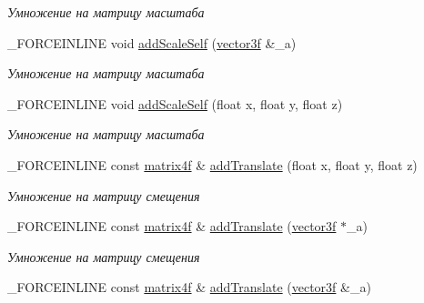 \begin{DoxyCompactItemize}
\begin{DoxyCompactList}\small\item\em Умножение на матрицу масштаба \end{DoxyCompactList}\item 
\hypertarget{classbt_1_1matrix4f_af8ae66d728afba44bf628a50da952781}{\-\_\-\-F\-O\-R\-C\-E\-I\-N\-L\-I\-N\-E void \hyperlink{classbt_1_1matrix4f_af8ae66d728afba44bf628a50da952781}{add\-Scale\-Self} (\hyperlink{classbt_1_1vector3f}{vector3f} \&\-\_\-a)}\label{classbt_1_1matrix4f_af8ae66d728afba44bf628a50da952781}

\begin{DoxyCompactList}\small\item\em Умножение на матрицу масштаба \end{DoxyCompactList}\item 
\hypertarget{classbt_1_1matrix4f_a6e9fc1f72c550c2051bb62585d600c09}{\-\_\-\-F\-O\-R\-C\-E\-I\-N\-L\-I\-N\-E void \hyperlink{classbt_1_1matrix4f_a6e9fc1f72c550c2051bb62585d600c09}{add\-Scale\-Self} (float x, float y, float z)}\label{classbt_1_1matrix4f_a6e9fc1f72c550c2051bb62585d600c09}

\begin{DoxyCompactList}\small\item\em Умножение на матрицу масштаба \end{DoxyCompactList}\item 
\hypertarget{classbt_1_1matrix4f_a793acb1ecdce969f670ce13fd0b6f68d}{\-\_\-\-F\-O\-R\-C\-E\-I\-N\-L\-I\-N\-E const \hyperlink{classbt_1_1matrix4f}{matrix4f} \& \hyperlink{classbt_1_1matrix4f_a793acb1ecdce969f670ce13fd0b6f68d}{add\-Translate} (float x, float y, float z)}\label{classbt_1_1matrix4f_a793acb1ecdce969f670ce13fd0b6f68d}

\begin{DoxyCompactList}\small\item\em Умножение на матрицу смещения \end{DoxyCompactList}\item 
\hypertarget{classbt_1_1matrix4f_aef54d68c64156a99a8e151da9c5f2cc1}{\-\_\-\-F\-O\-R\-C\-E\-I\-N\-L\-I\-N\-E const \hyperlink{classbt_1_1matrix4f}{matrix4f} \& \hyperlink{classbt_1_1matrix4f_aef54d68c64156a99a8e151da9c5f2cc1}{add\-Translate} (\hyperlink{classbt_1_1vector3f}{vector3f} $\ast$\-\_\-a)}\label{classbt_1_1matrix4f_aef54d68c64156a99a8e151da9c5f2cc1}

\begin{DoxyCompactList}\small\item\em Умножение на матрицу смещения \end{DoxyCompactList}\item 
\hypertarget{classbt_1_1matrix4f_a1d8fd299056a710c95b413f50f167a74}{\-\_\-\-F\-O\-R\-C\-E\-I\-N\-L\-I\-N\-E const \hyperlink{classbt_1_1matrix4f}{matrix4f} \& \hyperlink{classbt_1_1matrix4f_a1d8fd299056a710c95b413f50f167a74}{add\-Translate} (\hyperlink{classbt_1_1vector3f}{vector3f} \&\-\_\-a)}\label{classbt_1_1matrix4f_a1d8fd299056a710c95b413f50f167a74}


\end{DoxyCompactItemize}
